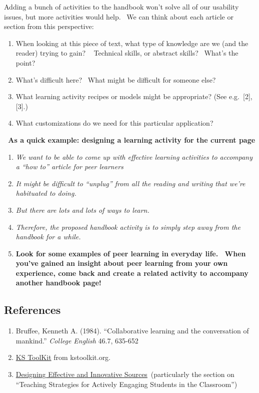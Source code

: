 Adding a bunch of activities to the handbook won't solve all of our
usability issues, but more activities would help.~ We can think about
each article or section from this perspective:

\begin{enumerate}
\def\labelenumi{\arabic{enumi}.}
\item
  When looking at this piece of text, what type of knowledge are we (and
  the reader) trying to gain? ~ Technical skills, or abstract skills?~
  What's the point?
\item
  What's difficult here? ~What might be difficult for someone else?
\item
  What learning activity recipes or models might be appropriate? (See
  e.g.~{{[}2{]}}, {{[}3{]}}.)
\item
  What customizations do we need for this particular application?
\end{enumerate}

\textbf{\emph{~}As a quick example: designing a learning activity for
the current page}

\begin{enumerate}
\def\labelenumi{\arabic{enumi}.}
\item
  \emph{We want to be able to come up with effective learning activities
  to accompany a ``how to'' article for peer learners}
\item
  \emph{It might be difficult to ``unplug'' from all the reading and
  writing that we're habituated to doing.}
\item
  \emph{But there are lots and lots of ways to learn.}
\item
  \emph{Therefore, the proposed handbook activity is to simply step away
  from the handbook for a while.}
\item
  \textbf{Look for some examples of peer learning in everyday life.~
  When you've gained an insight about peer learning from your own
  experience, come back and create a related activity to accompany
  another handbook page!}
\end{enumerate}

\subsection{References}\label{structure-references}

\begin{enumerate}
\def\labelenumi{\arabic{enumi}.}
\item
  Bruffee, Kenneth A. (1984). ``Collaborative learning and the
  conversation of mankind.'' \emph{College English} 46.7, 635-652
\item
  \href{http://www.kstoolkit.org/KS+Methods}{KS ToolKit} from
  kstoolkit.org.
\item
  \href{http://serc.carleton.edu/NAGTWorkshops/coursedesign/tutorial/strategies.html}{Designing
  Effective and Innovative Sources}~(particularly the section on
  ``Teaching Strategies for Actively Engaging Students in the
  Classroom'')
\end{enumerate}
